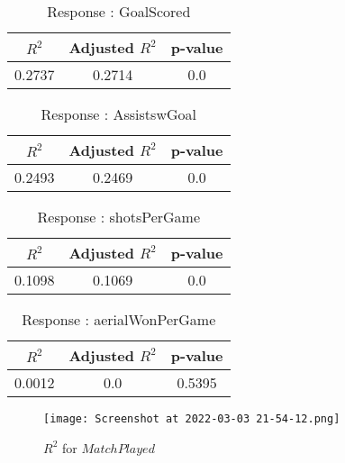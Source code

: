 \documentclass[12pt]{article}
\begin{document}
\begin{minipage}{0.5\textwidth}
	\begin{table}[H]
	\centering
	\caption{Response : GoalScored}\label{table:1a}
	{\begin{tabular}{|c|c|c|}
			\hline
			$ R^2 $ & Adjusted $ R^2 $ & p-value \\
			\hline
			0.2737 & 0.2714 & 0.0 \\
			\hline
		\end{tabular}
	}
\end{table}
\begin{table}[H]
	\centering
	\caption{Response : AssistswGoal}\label{table:1a}
	{\begin{tabular}{|c|c|c|}
			\hline
			$ R^2 $ & Adjusted $ R^2 $ & p-value \\
			\hline
			0.2493 & 0.2469 & 0.0 \\
			\hline
		\end{tabular}
	}
\end{table}

\end{minipage}
\hfill
\begin{minipage}{0.5\textwidth}
	\begin{table}[H]
	\centering
	\caption{Response : shotsPerGame }\label{table:1a}
	{\begin{tabular}{|c|c|c|}
			\hline
			$ R^2 $ & Adjusted $ R^2 $ & p-value \\
			\hline
			0.1098 & 0.1069 & 0.0 \\
			\hline
		\end{tabular}
	}
\end{table}
\begin{table}[H]
	\centering
	\caption{Response : aerialWonPerGame}\label{table:1a}
	{\begin{tabular}{|c|c|c|}
			\hline
			$ R^2 $ & Adjusted $ R^2 $ & p-value \\
			\hline
			0.0012 & 0.0 & 0.5395 \\
			\hline
		\end{tabular}
	}
\end{table}
\end{minipage}

\begin{figure}[H]
\centering
\texttt{[image: Screenshot at 2022-03-03 21-54-12.png]}
\caption{$ R^2 $ for $ MatchPlayed $}
\label{fig:1}
\end{figure}
\end{document}
